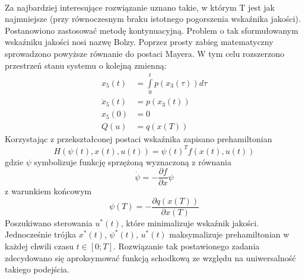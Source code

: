 \paragraph*{}
Za najbardziej interesujące rozwiązanie uznano takie, w którym T jest jak najmniejsze (przy równoczesnym braku istotnego pogorszenia wskaźnika jakości). Postanowiono zastosować metodę kontynuacyjną. \newline
Problem o tak sformułowanym wskaźniku jakości nosi nazwę Bolzy. Poprzez prosty zabieg matematyczny sprowadzono powyższe równanie do postaci Mayera. W tym celu rozszerzono przestrzeń stanu systemu o kolejną zmienną:
\begin{equation}
\begin{aligned}
x_5(t)&=\int\limits_{0}^{t}p(x_3(\tau))d\tau \\
\dot{x}_5(t)&=p(x_3(t))\\
x_5(0)&=0\\
Q(u)&=q(x(T))
\end{aligned}
\end{equation}
Korzystając z przekształconej postaci wskaźnika zapisano prehamiltonian
\begin{equation}
H(\psi(t),x(t),u(t))=\psi(t)^Tf(x(t),u(t))
\end{equation}
gdzie $\psi$ symbolizuje funkcję sprzężoną wyznaczoną z równania
\begin{equation}
\dot \psi=-\frac{\partial f}{\partial x}\psi
\end{equation}
z warunkiem końcowym
\begin{equation}
\psi(T)=-\frac{\partial q(x(T))}{\partial x(T)}
\end{equation}
Poszukiwano sterowania $u^*(t)$, które minimalizuje wskaźnik jakości. Jednocześnie trójka $x^*(t)$, $\psi^*(t)$, $u^*(t)$ maksymalizuje prehamiltonian w każdej chwili czasu $t\in[0;T]$. Rozwiązanie tak postawionego zadania zdecydowano się aproksymować funkcją schodkową ze względu na uniwersalność takiego podejścia.

